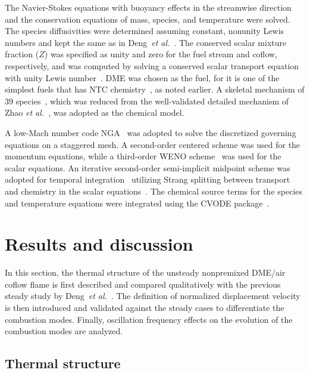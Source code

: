 \documentclass[review,3p,times]{elsarticle}
\begin{document}
The Navier-Stokes equations with buoyancy effects in the streamwise direction and the conservation equations of mass, species, and temperature were solved.  The species diffusivities were determined assuming constant, nonunity Lewis numbers and kept the same as in Deng~\emph{et al.}~\cite{deng15}.  The conserved scalar mixture fraction ($Z$) was specified as unity and zero for the fuel stream and coflow, respectively, and was computed by solving a conserved scalar transport equation with unity Lewis number~\cite{pitsch98b}.  DME was chosen as the fuel, for it is one of the simplest fuels that has NTC chemistry~\cite{deng14}, as noted earlier.  A skeletal mechanism of $39$ species~\cite{bhagatwala15}, which was reduced from the well-validated detailed mechanism of Zhao \emph{et al.}~\cite{zhao08}, was adopted as the chemical model.    

A low-Mach number code NGA~\cite{desjardins08} was adopted to solve the discretized governing equations on a staggered mesh.  A second-order centered scheme was used for the momentum equations, while a third-order WENO scheme~\cite{liu94} was used for the scalar equations.  An iterative second-order semi-implicit midpoint scheme was adopted for temporal integration~\cite{pierce01} utilizing Strang splitting between transport and chemistry in the scalar equations\textcolor{Rev1}{~\cite{macart16}}.  The chemical source terms for the species and temperature equations were integrated using the CVODE package~\cite{cohen96}.


\section{Results and discussion}

In this section, the thermal structure of the unsteady nonpremixed DME/air coflow flame is first described and compared qualitatively with the previous steady study by Deng~\emph{et al.}~\cite{deng15b}.  The definition of normalized displacement velocity is then introduced and validated against the steady cases to differentiate the combustion modes.  Finally, oscillation frequency effects on the evolution of the combustion modes are analyzed.   

\subsection{Thermal structure}
\end{document}
